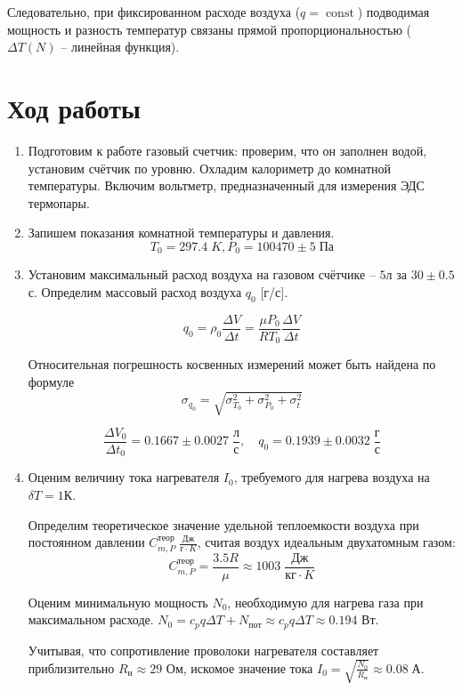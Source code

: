 \documentclass[a4paper,12pt]{article}
\DeclareMathOperator{\const}{\mathop{const}}
\begin{document}
	Следовательно, при фиксированном расходе воздуха ($q = \const$) подводимая мощность и разность температур связаны прямой пропорциональностью ($\Delta T(N)$ -- линейная функция).

	\section{Ход работы}

	\begin{enumerate}
		\item Подготовим к работе газовый счетчик: проверим, что он заполнен  водой, установим счётчик по уровню. Охладим калориметр до комнатной температуры. Включим вольтметр, предназначенный для измерения ЭДС термопары.

		\item Запишем показания комнатной температуры и давления. $$T_{0} = 297.4 \; K, P_{0} = 100470 \pm 5 \; {Па} $$

		\item Установим максимальный расход воздуха на газовом счётчике -- $5$л за $30 \pm 0.5$с. Определим массовый расход воздуха $q_{0}$ [г/с].

		$$q_0 = \rho_0 \frac{\Delta V}{\Delta t} = \frac{\mu P_0}{RT_0} \frac{\Delta V}{\Delta t}$$

		Относительная погрешность косвенных измерений может быть найдена по формуле $$\sigma_{q_0} = \sqrt{\sigma_{T_0}^2 + \sigma_{P_0}^2 + \sigma_t^2}$$

		$$\frac{\Delta V_0}{\Delta t_0} = 0.1667\pm0.0027 \; \frac{л}{с} ,\quad  q_0 = 0.1939 \pm 0.0032 \; \frac{г}{с} $$

		\item Оценим величину тока нагревателя $I_{0}$, требуемого для нагрева воздуха на $\delta T = 1 {К}$.

		Определим теоретическое значение удельной теплоемкости воздуха при постоянном давлении $C_{m, P}^{теор} \; \frac{Дж}{г\cdot K}$, считая воздух идеальным двухатомным газом: $$C_{m, P}^{теор} = \frac{3.5R}{\mu} \approx 1003 \; \frac{Дж}{кг\cdot K}$$

		Оценим минимальную мощность $N_0$, необходимую для нагрева газа при максимальном расходе. $N_{0} = c_{p}q\Delta T + N_{пот} \approx c_{p}q\Delta T \approx 0.194$ Вт.

		Учитывая, что сопротивление проволоки нагревателя составляет приблизительно $R_{н} \approx 29$ Ом, искомое значение тока $I_{0} = \sqrt{\frac{N_{0}}{R_{н}}} \approx 0.08 \; {А}.$


\end{enumerate}
\end{document}
